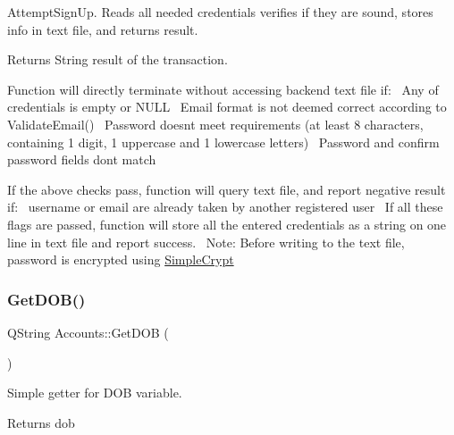 Attempt\+Sign\+Up. Reads all needed credentials verifies if they are sound, stores info in text file, and returns result. 

\begin{DoxyReturn}{Returns}
String result of the transaction.
\end{DoxyReturn}
Function will directly terminate without accessing backend text file if\+:~\newline
Any of credentials is empty or N\+U\+LL~\newline
Email format is not deemed correct according to Validate\+Email()~\newline
Password doesn\textquotesingle{}t meet requirements (at least 8 characters, containing 1 digit, 1 uppercase and 1 lowercase letters)~\newline
Password and confirm password fields don\textquotesingle{}t match~\newline


If the above checks pass, function will query text file, and report negative result if\+:~\newline
username or email are already taken by another registered user~\newline
 If all these flags are passed, function will store all the entered credentials as a string on one line in text file and report success.~\newline
Note\+: Before writing to the text file, password is encrypted using \hyperlink{classSimpleCrypt}{Simple\+Crypt} \mbox{\label{classAccounts_add43226d678648809eae2c7b11d3692b}} 
\subsubsection{\texorpdfstring{Get\+D\+O\+B()}{GetDOB()}}
{\footnotesize\ttfamily Q\+String Accounts\+::\+Get\+D\+OB (\begin{DoxyParamCaption}{ }\end{DoxyParamCaption})}



Simple getter for D\+OB variable. 

\begin{DoxyReturn}{Returns}
dob 
\end{DoxyReturn}
\mbox{\label{classAccounts_a264f663ad2a101cdbfbf12d083ee86b5}} 
